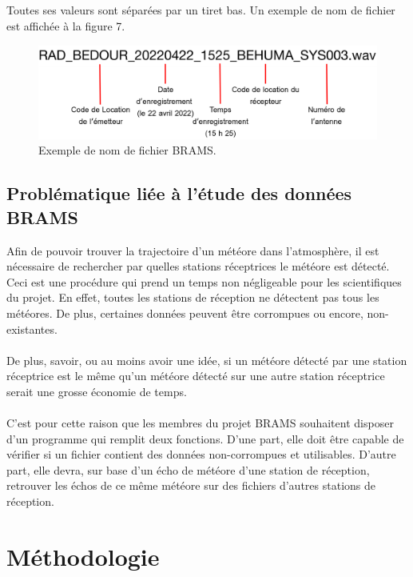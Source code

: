 \documentclass[11pt]{article}
\begin{document}
Toutes ses valeurs sont séparées par un tiret bas.
Un exemple de nom de fichier est affichée à la figure 7.

\begin{figure}[t]
    \begin{center}
        \includegraphics[scale=0.15]{file_name.png}
        \caption{Exemple de nom de fichier BRAMS.}
    \end{center}
\end{figure}

\newpage

\subsection{Problématique liée à l'étude des données BRAMS}

Afin de pouvoir trouver la trajectoire d'un météore dans l'atmosphère, il est nécessaire de rechercher par quelles stations réceptrices le météore est détecté.
Ceci est une procédure qui prend un temps non négligeable pour les scientifiques du projet.
En effet, toutes les stations de réception ne détectent pas tous les météores.
De plus, certaines données peuvent être corrompues ou encore, non-existantes.\\
\\
De plus, savoir, ou au moins avoir une idée, si un météore détecté par une station réceptrice est le même qu'un météore détecté sur une autre station réceptrice serait une grosse économie de temps.\\
\\
C'est pour cette raison que les membres du projet BRAMS souhaitent disposer d'un programme qui remplit deux fonctions.
D'une part, elle doit être capable de vérifier si un fichier contient des données non-corrompues et utilisables.
D'autre part, elle devra, sur base d'un écho de météore d'une station de réception, retrouver les échos de ce même météore sur des fichiers d'autres stations de réception.

\newpage

\section{Méthodologie}
\end{document}
